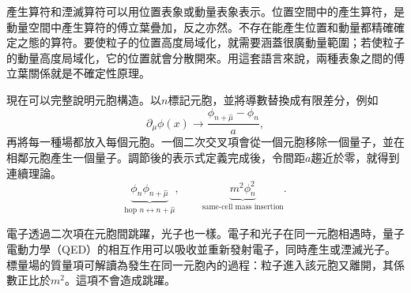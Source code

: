 產生算符和湮滅算符可以用位置表象或動量表象表示。位置空間中的產生算符，是動量空間中產生算符的傅立葉疊加，反之亦然。不存在能產生位置和動量都精確確定之態的算符。要使粒子的位置高度局域化，就需要涵蓋很廣動量範圍；若使粒子的動量高度局域化，它的位置就會分散開來。用這套語言來說，兩種表象之間的傅立葉關係就是不確定性原理。

\begin{classroomqa}
\end{classroomqa}

現在可以完整說明元胞構造。以\(n\)標記元胞，並將導數替換成有限差分，例如
\begin{equation}
\partial_\mu\phi(x)
\longrightarrow
\frac{\phi_{n+\hat\mu}-\phi_n}{a},
\end{equation}
再將每一種場都放入每個元胞。一個二次交叉項會從一個元胞移除一個量子，並在相鄰元胞產生一個量子。調節後的表示式定義完成後，令間距\(a\)趨近於零，就得到連續理論。
\begin{equation}
\underbrace{\phi_n\phi_{n+\hat\mu}}_{\text{hop }n\leftrightarrow n+\hat\mu},
\qquad
\underbrace{m^2\phi_n^2}_{\text{same-cell mass insertion}}.
\end{equation}

\begin{classroomqa}
\end{classroomqa}

電子透過二次項在元胞間跳躍，光子也一樣。電子和光子在同一元胞相遇時，量子電動力學（QED）的相互作用可以吸收並重新發射電子，同時產生或湮滅光子。標量場的質量項可解讀為發生在同一元胞內的過程：粒子進入該元胞又離開，其係數正比於\(m^2\)。這項不會造成跳躍。

\begin{classroomqa}
\end{classroomqa}

\begin{classroomqa}
\end{classroomqa}


